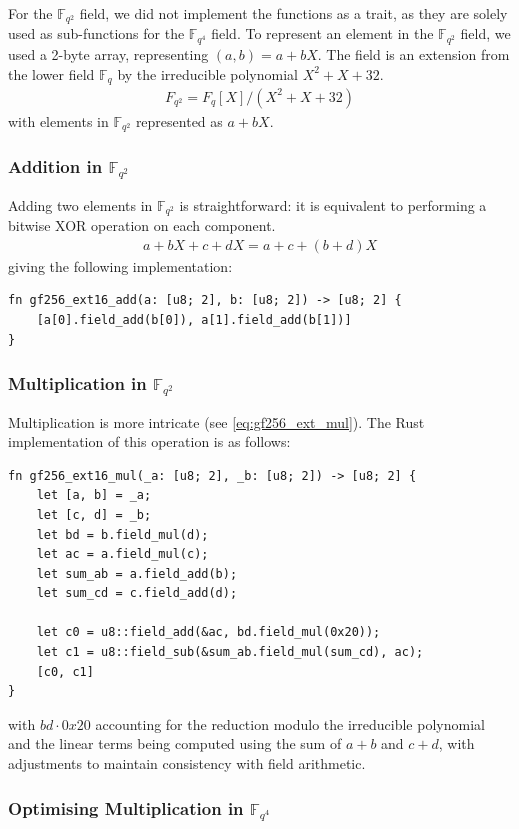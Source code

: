 \documentclass[11pt]{report}
\theoremstyle{definition}
\theoremstyle{plain}
\begin{document}
For the $\mathbb{F}_{q^2}$ field, we did not implement the functions as a trait, as they are solely used as sub-functions for the $\mathbb{F}_{q^4}$ field. To represent an element in the $\mathbb{F}_{q^2}$ field, we used a 2-byte array, representing $(a, b) = a + bX$. The field is an extension from the lower field $\mathbb{F}_q$ by the irreducible polynomial $X^2 + X + 32$.
\begin{align}
  F_{q^2} = F_q[X] / (X^2 + X + 32)
\end{align}
with elements in $\mathbb{F}_{q^2}$ represented as $a + bX$.

\subsubsection*{Addition in $\mathbb{F}_{q^2}$}

Adding two elements in $\mathbb{F}_{q^2}$ is straightforward: it is equivalent to performing a bitwise XOR operation on each component.
\begin{align*}
  a + bX + c + dX = a+c + (b+d)X
\end{align*}
giving the following implementation:
\begin{verbatim}
fn gf256_ext16_add(a: [u8; 2], b: [u8; 2]) -> [u8; 2] {
    [a[0].field_add(b[0]), a[1].field_add(b[1])]
}
\end{verbatim}

\subsubsection*{Multiplication in $\mathbb{F}_{q^2}$}

Multiplication is more intricate (see \autoref{eq:gf256_ext_mul}). The Rust implementation of this operation is as follows:
\begin{verbatim}
fn gf256_ext16_mul(_a: [u8; 2], _b: [u8; 2]) -> [u8; 2] {
    let [a, b] = _a;
    let [c, d] = _b;
    let bd = b.field_mul(d);
    let ac = a.field_mul(c);
    let sum_ab = a.field_add(b);
    let sum_cd = c.field_add(d);

    let c0 = u8::field_add(&ac, bd.field_mul(0x20));
    let c1 = u8::field_sub(&sum_ab.field_mul(sum_cd), ac);
    [c0, c1]
}
\end{verbatim}
with $bd \cdot 0x20$ accounting for the reduction modulo the irreducible polynomial and the linear terms being computed using the sum of $a+b$ and $c+d$, with adjustments to maintain consistency with field arithmetic.

\subsubsection*{Optimising Multiplication in $\mathbb{F}_{q^4}$}
\end{document}
